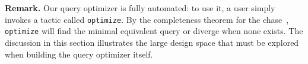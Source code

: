 \documentclass[preprint]{sigplanconf}
\newcommand{\ltac}[0]{\ensuremath{\mathcal{L}_{\mathrm{tac}}}}
\begin{document}
{\bf Remark.}  Our query optimizer is fully automated: to use it, a user simply invokes a tactic called {\tt optimize}.  By the completeness theorem for the chase~\cite{Popa99anequational}, {\tt optimize} will find the minimal equivalent query or diverge when none exists.  The discussion in this section illustrates the large design space that must be explored when building the query optimizer itself.  





\end{document}
